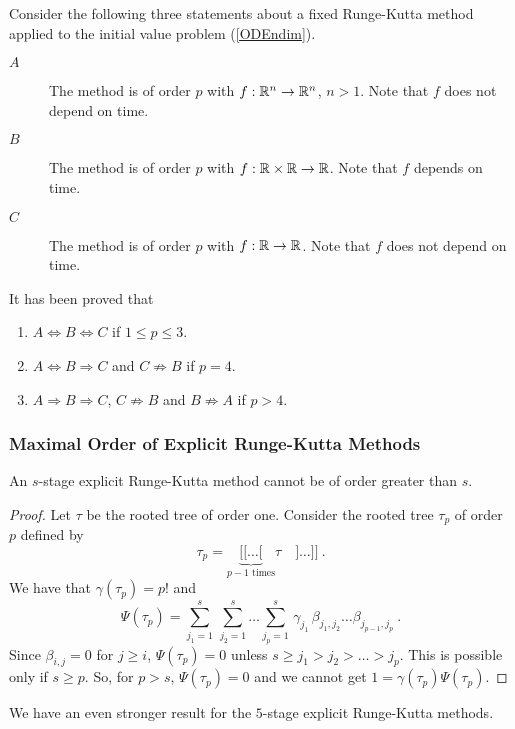 \begin{rmk}
Consider the following three statements about a fixed Runge-Kutta
method applied to the initial value problem (\ref{ODEndim}).
\begin{description}
\item[$A$] The method is of order $p$ with $f:\mathbb{R}^n \rightarrow \mathbb{R}^n$,
$n>1$.  Note that $f$ does not depend on time.
\item[$B$] The method is of order $p$ with $f:\mathbb{R} \times \mathbb{R} \rightarrow \mathbb{R}$.
Note that $f$ depends on time. 
\item[$C$] The method is of order $p$ with $f:\mathbb{R} \rightarrow \mathbb{R}$.  Note
that $f$ does not depend on time. 
\end{description}
It has been proved that
\begin{enumerate}
\item $A \Leftrightarrow B \Leftrightarrow C$  if $1\leq p \leq 3$.
\item $A \Leftrightarrow B \Rightarrow C$ and $C \not\Rightarrow B$ if
$p=4$.
\item $A \Rightarrow B \Rightarrow C$, $C \not\Rightarrow B$ and
$B \not\Rightarrow A$ if $p > 4$.
\end{enumerate}
\end{rmk}

\subsubsection{Maximal Order of Explicit Runge-Kutta Methods}

\begin{theorem}
An $s$-stage explicit Runge-Kutta method cannot be of order greater
than $s$.
\end{theorem}

\begin{proof}
Let $\tau$ be the rooted tree of order one.  Consider the rooted tree
$\tau_p$ of order $p$ defined by
\[
\tau_p = \underbrace{[[\ldots[}_{\text{$p-1$ times}} \tau \quad ]\ldots]]
\ .
\]
We have that $\gamma(\tau_p) = p!$ and
\[
\Psi(\tau_p) = \sum_{j_1=1}^s\,\sum_{j_2=1}^s\ldots\sum_{j_p=1}^s\,
\gamma_{j_1}\,\beta_{j_1,j_2}\dots \beta_{j_{p-1},j_p} \ .
\]
Since $\beta_{i,j} = 0$ for $j\geq i$, $\Psi(\tau_p)=0$ unless
$s \geq j_1 > j_2 > \ldots > j_p$.  This is possible only if
$s \geq p$.  So, for $p>s$, $\Psi(\tau_p) = 0$ and we cannot get
$1 = \gamma(\tau_p)\Psi(\tau_p)$.
\end{proof}

We have an even stronger result for the $5$-stage explicit Runge-Kutta
methods.

